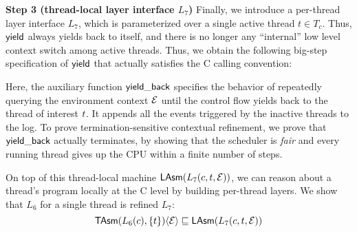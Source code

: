 
\noindent\textbf{Step 3 (thread-local layer interface $L_7$)} 
Finally, we introduce a per-thread layer interface $L_7$, which is parameterized
over a single active thread $t\in T_c$.
Thus, $\yield$ always yields back to itself,
and there is no longer any ``internal'' low level context switch among active threads.
Thus, we obtain the following big-step specification of $\yield$ that actually
satisfies the C calling convention:
\begin{small}
\begin{mathpar}
\end{mathpar}
\end{small}%
Here, the auxiliary function $\comm{yield\_back}$ 
specifies the behavior of repeatedly querying the environment context
$\oracle$ until the control flow yields back to the thread of interest $\tid$.
It appends all the events triggered by the inactive threads to the log.
To prove termination-sensitive contextual refinement,
we prove that $\comm{yield\_back}$ actually terminates,
by showing that the scheduler is \emph{fair} and every running
thread gives up the CPU within a finite number of steps.

On top of this thread-local machine $\LAsm(L_7(c, t, \oracle))$,
we can reason about a thread's program 
locally at the C level by building per-thread layers.
We show that $L_6$ for a single thread is refined $L_7$:
{\small
\[ \TAsm(L_6(c), \{t\})\langle \oracle \rangle \Refrel \LAsm(L_7(c, t, \oracle)) \]
}%


